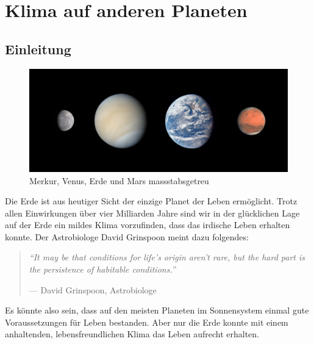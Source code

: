 %
%
%

\chapter{Klima auf anderen Planeten\label{chapter:planeten}}
\begin{refsection}

\section{Einleitung}

\begin{figure}
	\centering
	\includegraphics[width=0.7\linewidth, trim={0 2cm 0 2cm},clip]{planeten/Pictures/planets2.jpg}
	\caption{Merkur, Venus, Erde und Mars massstabsgetreu}
\end{figure}

Die Erde ist aus heutiger Sicht der einzige Planet der Leben ermöglicht. Trotz allen Einwirkungen über vier Milliarden Jahre sind wir in der glücklichen Lage auf der Erde ein mildes Klima vorzufinden, dass das irdische Leben erhalten konnte. 
%
%
Der Astrobiologe David Grinspoon meint dazu folgendes:
%
\begin{quote}
\textit{“It may be that conditions for life’s origin aren’t rare, but the hard part is the persistence of habitable conditions.”}
\begin{flushright}
--- David Grinspoon, Astrobiologe \cite{planeten:AstrobiologyMagazine} %
\end{flushright}
\end{quote}
Es könnte also sein, dass auf den meisten Planeten im Sonnensystem einmal gute Voraussetzungen für Leben bestanden. Aber nur die Erde konnte mit einem anhaltenden, lebensfreundlichen Klima das Leben aufrecht erhalten.


\end{refsection}
